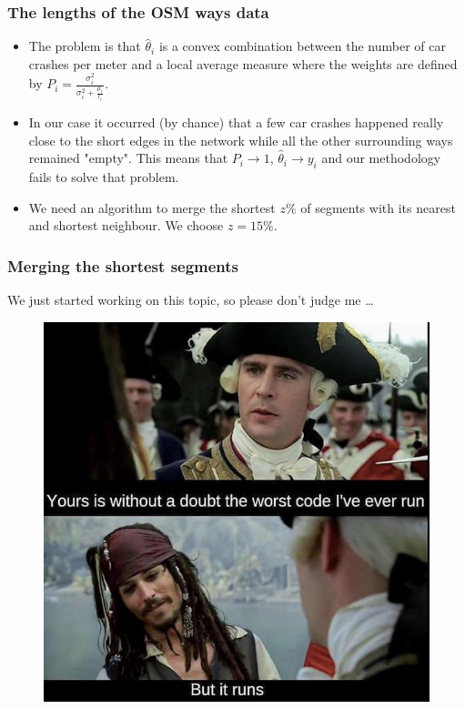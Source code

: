 \documentclass[c,10pt,pdftex]{beamer}
\begin{document}
\begin{frame}
\frametitle{The lengths of the OSM ways data}
\vspace{-0.75cm}
\begin{itemize}
	\setlength\itemsep{1em}
	\item The problem is that $\hat{\theta}_i$ is a convex combination between the number of car crashes per meter and a local average measure where the weights are defined by $P_i = \frac{\sigma^2_i}{\sigma^2_i + \frac{\mu_i}{l_i}}$. 
	
	\item In our case it occurred (by chance) that a few car crashes happened really close to the short edges in the network while all the other surrounding ways remained "empty". This means that $P_i \to 1$, $\hat{\theta}_i \to y_i$ and our methodology fails to solve that problem.
	
	\item  We need an algorithm to merge the shortest $z\%$ of segments with its nearest and shortest neighbour. We choose $z = 15\%$. 
\end{itemize}
\end{frame}

\begin{frame}
\frametitle{Merging the shortest segments}
\vspace{-0.5cm}
We just started working on this topic, so please don't judge me \dots
\begin{figure}
	\centering
	\includegraphics[height=0.7\textheight]{images/js.jpeg}
\end{figure}
\end{frame}
\end{document}
